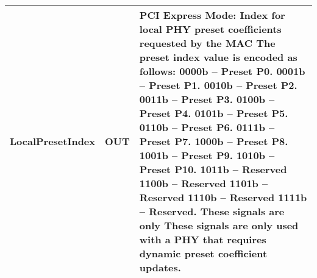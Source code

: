\begin{table}[H]

  \centering
\begin{tabular}{ |P{60mm}|P{10mm}|m{60mm}| }
\hline
LocalPresetIndex \newline [4*LANESNUMBER -1:0] & OUT & 
PCI Express Mode: \newline
Index for local PHY preset coefficients
requested by the MAC \newline
The preset index value is encoded as follows: \newline
0000b – Preset P0.    \newline
0001b – Preset P1.  \newline
0010b – Preset P2.  \newline
0011b – Preset P3.  \newline
0100b – Preset P4.  \newline
0101b – Preset P5.  \newline
0110b – Preset P6.  \newline
0111b – Preset P7.  \newline
1000b – Preset P8.  \newline
1001b – Preset P9.  \newline
1010b – Preset P10. \newline
1011b – Reserved      \newline
1100b – Reserved      \newline
1101b – Reserved    \newline
1110b – Reserved      \newline
1111b – Reserved.     \newline
These signals are only      \newline
These signals are only used with a PHY that
requires dynamic preset coefficient updates.
\\ \hline
\end{tabular}
\end{table}


